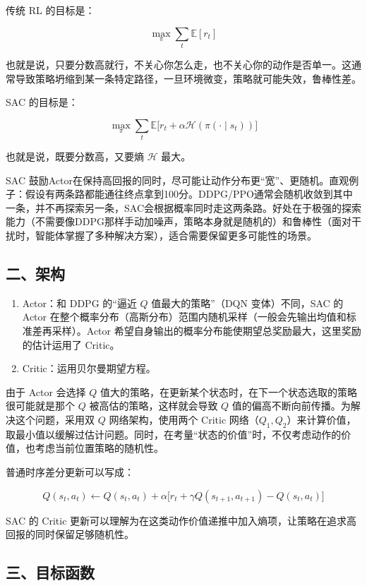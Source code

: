 传统 RL 的目标是：

\[
\max_\pi
\sum_t
\mathbb{E}[r_t]
\]

也就是说，只要分数高就行，不关心你怎么走，也不关心你的动作是否单一。这通常导致策略坍缩到某一条特定路径，一旦环境微变，策略就可能失效，鲁棒性差。

SAC 的目标是：

\[
\max_\pi
\sum_t
\mathbb{E}
\bigl[
r_t+\alpha\mathcal{H}(\pi(\cdot\mid s_t))
\bigr]
\]

也就是说，既要分数高，又要熵 \(\mathcal{H}\) 最大。

SAC 鼓励Actor在保持高回报的同时，尽可能让动作分布更``宽''、更随机。直观例子：假设有两条路都能通往终点拿到100分。DDPG/PPO通常会随机收敛到其中一条，并不再探索另一条，SAC会根据概率同时走这两条路。好处在于极强的探索能力（不需要像DDPG那样手动加噪声，策略本身就是随机的）和鲁棒性（面对干扰时，智能体掌握了多种解决方案），适合需要保留更多可能性的场景。

\hypertarget{ux4e8cux67b6ux6784}{%
\subsection{二、架构}\label{ux4e8cux67b6ux6784}}

\begin{enumerate}
\def\labelenumi{\arabic{enumi}.}
\item
  Actor：和 DDPG 的``逼近 \(Q\) 值最大的策略''（DQN 变体）不同，SAC 的 Actor 在整个概率分布（高斯分布）范围内随机采样（一般会先输出均值和标准差再采样）。Actor 希望自身输出的概率分布能使期望总奖励最大，这里奖励的估计运用了 Critic。
\item
  Critic：运用贝尔曼期望方程。
\end{enumerate}

由于 Actor 会选择 \(Q\) 值大的策略，在更新某个状态时，在下一个状态选取的策略很可能就是那个 \(Q\) 被高估的策略，这样就会导致 \(Q\) 值的偏高不断向前传播。为解决这个问题，采用双 \(Q\) 网络架构，使用两个 Critic 网络（\(Q_1,Q_2\)）来计算价值，取最小值以缓解过估计问题。同时，在考量``状态的价值''时，不仅考虑动作的价值，也考虑当前位置策略的随机性。

普通时序差分更新可以写成：

\[
Q(s_t,a_t)
\leftarrow
Q(s_t,a_t)
+
\alpha
\bigl[
r_t+\gamma Q(s_{t+1},a_{t+1})-Q(s_t,a_t)
\bigr]
\]

SAC 的 Critic 更新可以理解为在这类动作价值递推中加入熵项，让策略在追求高回报的同时保留足够随机性。

\hypertarget{ux4e09ux76eeux6807ux51fdux6570}{%
\subsection{三、目标函数}\label{ux4e09ux76eeux6807ux51fdux6570}}

